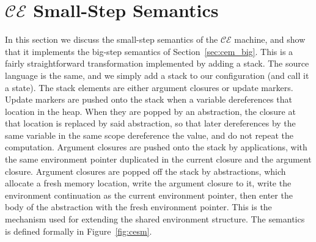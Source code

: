 \section{$\mathcal{CE}$ Small-Step Semantics} \label{sec:cem_small}

In this section we discuss the small-step semantics of the $\mathcal{CE}$
machine, and show that it implements the big-step semantics of
Section~\ref{sec:cem_big}. This is a fairly straightforward transformation implemented
by adding a stack. The source language is the same, and we simply add a stack to
our configuration (and call it a state). The stack elements are either argument
closures or update markers. Update markers are pushed onto the stack when a
variable dereferences that location in the heap. When they are popped by an
abstraction, the closure at that location is replaced by said abstraction, so
that later dereferences by the same variable in the same scope dereference the
value, and do not repeat the computation.  Argument closures are pushed onto the
stack by applications, with the same environment pointer duplicated in the
current closure and the argument closure.  Argument closures are popped off the
stack by abstractions, which allocate a fresh memory location, write the
argument closure to it, write the environment continuation as the current
environment pointer, then enter the body of the abstraction with the fresh
environment pointer. This is the mechanism used for extending the shared
environment structure. The semantics is defined formally in
Figure~\ref{fig:cesm}.  

